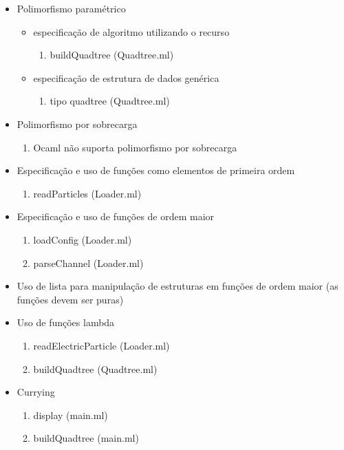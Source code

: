 \documentclass[a4paper,10pt]{article}
\begin{document}
\begin{itemize}
\begin{itemize}
	\end{itemize}
 \item Polimorfismo paramétrico
	\begin{itemize}
	 \item especificação de algoritmo utilizando o recurso
	 {\color{done}
		\begin{enumerate}
			\item buildQuadtree (Quadtree.ml)
		\end{enumerate}
		}
	 \item especificação de estrutura de dados genérica
	 {\color{done}
		\begin{enumerate}
			\item tipo quadtree (Quadtree.ml)
		\end{enumerate}
		}
	\end{itemize}
 \item Polimorfismo por sobrecarga
		{\color{notDone}
		\begin{enumerate}
			\item Ocaml não suporta polimorfismo por sobrecarga
		\end{enumerate}
		}
 \item Especificação e uso de funções como elementos de primeira ordem		
		{\color{done}
		\begin{enumerate}
			\item readParticles (Loader.ml)
		\end{enumerate}
		}
 \item Especificação e uso de funções de ordem maior
		{\color{done}
		\begin{enumerate}
			\item loadConfig (Loader.ml)
			\item parseChannel (Loader.ml)
		\end{enumerate}
		}
 \item Uso de lista para manipulação de estruturas em funções de ordem maior (as funções devem ser puras)
 \item Uso de funções lambda
		{\color{done}
		\begin{enumerate}
			\item readElectricParticle (Loader.ml)
			\item buildQuadtree (Quadtree.ml)
		\end{enumerate}
		}
 \item Currying
		{\color{done}
		\begin{enumerate}
			\item display (main.ml)
			\item buildQuadtree (main.ml)

\end{enumerate}}
\end{itemize}
\end{document}
